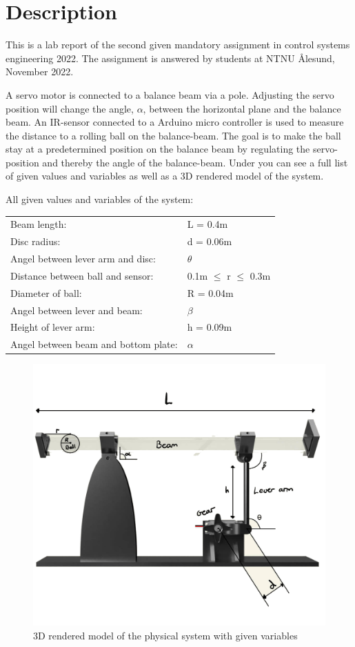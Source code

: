\section{Description}

This is a lab report of the second given mandatory assignment in control systems engineering 2022. The assignment is answered by students at NTNU Ålesund, November 2022.

A servo motor is connected to a balance beam via a pole. Adjusting the servo position will change the angle, $\alpha$, between the horizontal plane and the balance beam. An IR-sensor connected to a Arduino micro controller is used to measure the distance to a rolling ball on the balance-beam. The goal is to make the ball stay at a predetermined position on the balance beam by regulating the servo-position and thereby the angle of the balance-beam. Under you can see a full list of given values and variables as well as a 3D rendered model of the system.
\vfill

All given values and variables of the system:


\begin{tabular}{ll}
Beam length:                           & L = 0.4m\\
Disc radius:                           & d = 0.06m\\
Angel between lever arm and disc:      & $\theta$\\
Distance between ball and sensor:      & 0.1m $\leq$ r $\leq$ 0.3m\\
Diameter of ball:                      & R = 0.04m\\
Angel between lever and beam:          & $\beta$\\
Height of lever arm:                   & h = 0.09m\\
Angel between beam and bottom plate:   & $\alpha$\\
\end{tabular}                                   


\begin{figure}[h]
    \centering
    \includegraphics[width = 1\textwidth]{Code/Images/3D-MAIN.png}
    \caption{3D rendered model of the physical system with given variables}
    \label{fig:3d-model}
\end{figure}

